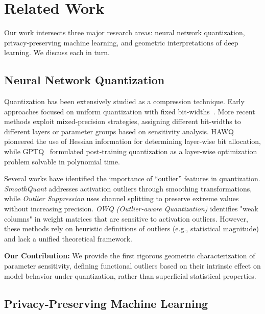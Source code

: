 \documentclass[letterpaper,twocolumn,10pt]{article}
\begin{document}
\section{Related Work}
\label{sec:related}

Our work intersects three major research areas: neural network quantization, privacy-preserving machine learning, and geometric interpretations of deep learning. We discuss each in turn.

\subsection{Neural Network Quantization}

Quantization has been extensively studied as a compression technique. Early approaches focused on uniform quantization with fixed bit-widths~\cite{deng2020model}. More recent methods exploit mixed-precision strategies, assigning different bit-widths to different layers or parameter groups based on sensitivity analysis. HAWQ~\cite{frantar2022gptq} pioneered the use of Hessian information for determining layer-wise bit allocation, while GPTQ~\cite{frantar2022gptq} formulated post-training quantization as a layer-wise optimization problem solvable in polynomial time.

Several works have identified the importance of ``outlier'' features in quantization. \emph{SmoothQuant} addresses activation outliers through smoothing transformations, while \emph{Outlier Suppression} uses channel splitting to preserve extreme values without increasing precision. \emph{OWQ (Outlier-aware Quantization)} identifies "weak columns" in weight matrices that are sensitive to activation outliers. However, these methods rely on heuristic definitions of outliers (e.g., statistical magnitude) and lack a unified theoretical framework.

\textbf{Our Contribution:} We provide the first rigorous geometric characterization of parameter sensitivity, defining functional outliers based on their intrinsic effect on model behavior under quantization, rather than superficial statistical properties.

\subsection{Privacy-Preserving Machine Learning}
\end{document}
